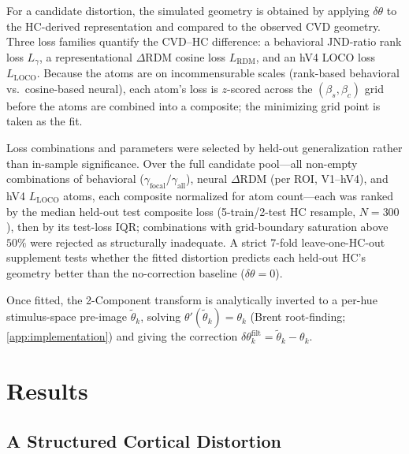\documentclass{article}
\begin{document}
For a candidate distortion, the simulated geometry is obtained by applying $\delta\theta$ to the HC-derived representation and compared to the observed CVD geometry.
Three loss families quantify the CVD--HC difference: a behavioral JND-ratio rank loss $L_\gamma$, a representational $\Delta$RDM cosine loss $L_{\text{RDM}}$, and an hV4 LOCO loss $L_{\text{LOCO}}$.
Because the atoms are on incommensurable scales (rank-based behavioral vs.\ cosine-based neural), each atom's loss is $z$-scored across the $(\beta_s, \beta_c)$ grid before the atoms are combined into a composite; the minimizing grid point is taken as the fit.

Loss combinations and parameters were selected by held-out generalization rather than in-sample significance.
Over the full candidate pool---all non-empty combinations of behavioral ($\gamma_{\text{focal}}/\gamma_{\text{all}}$), neural $\Delta$RDM (per ROI, V1--hV4), and hV4 $L_{\text{LOCO}}$ atoms, each composite normalized for atom count---each was ranked by the median held-out test composite loss (5-train/2-test HC resample, $N{=}300$), then by its test-loss IQR; combinations with grid-boundary saturation above $50\%$ were rejected as structurally inadequate.
A strict 7-fold leave-one-HC-out supplement tests whether the fitted distortion predicts each held-out HC's geometry better than the no-correction baseline ($\delta\theta = 0$).

Once fitted, the 2-Component transform is analytically inverted to a per-hue stimulus-space pre-image $\tilde\theta_k$, solving $\theta'(\tilde\theta_k) = \theta_k$ (Brent root-finding; \cref{app:implementation}) and giving the correction $\delta\theta_k^{\text{filt}} = \tilde\theta_k - \theta_k$.

\section{Results}
\label{sec:results}

\subsection{A Structured Cortical Distortion}
\label{sec:results_distortion}
\end{document}
